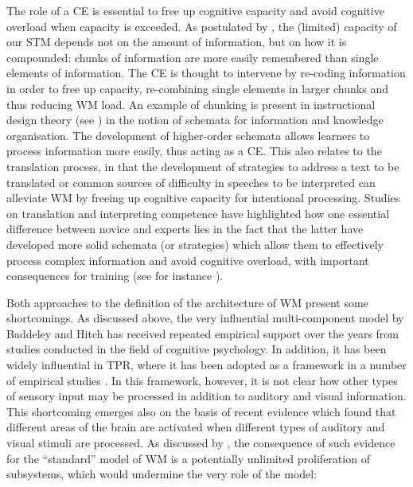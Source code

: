 The role of a CE is essential to free up cognitive capacity and avoid cognitive overload when capacity is exceeded. As postulated by \citet{miller_magical_1956}, the (limited) capacity of our STM depends not on the amount of information, but on how it is compounded: chunks of information are more easily remembered than single elements of information. The CE is thought to intervene by re-coding information in order to free up capacity, re-combining single elements in larger chunks and thus reducing WM load. An example of chunking is present in instructional design theory (see \citealt{van_merrienboer_cognitive_2005}) in the notion of schemata for information and knowledge organisation. The development of higher-order schemata allows learners to process information more easily, thus acting as a CE. This also relates to the translation process, in that the development of strategies to address a text to be translated or common sources of difficulty in speeches to be interpreted can alleviate WM by freeing up cognitive capacity for intentional processing. Studies on translation and interpreting competence have highlighted how one essential difference between novice and experts lies in the fact that the latter have developed more solid schemata (or strategies) which allow them to effectively process complex information and avoid cognitive overload, with important consequences for training (see for instance \citealt{riccardi_evolution_2005}).

Both approaches to the definition of the architecture of WM present some shortcomings. As discussed above, the very influential multi-component model by Baddeley and Hitch has received repeated empirical support over the years from studies conducted in the field of cognitive psychology. In addition, it has been widely influential in TPR, where it has been adopted as a framework in a number of empirical studies \citep{daro_verbal_1994,dragsted_segmentation_2004,mizuno_process_2005,padilla_articulatory_2005,kosma_fonctionnement_2007,hvelplund_allocation_2011,kopke_methodological_2012,ferreira_simultaneous_2015}.
In this framework, however, it is not clear how other types of sensory input may be processed in addition to auditory and visual information. This shortcoming emerges also on the basis of recent evidence which found that different areas of the brain are activated when different types of auditory and visual stimuli are processed. As discussed by \citet{postle_working_2006}, the consequence of such evidence for the ``standard'' model of WM is a potentially unlimited proliferation of subsystems, which would undermine the very role of the model: 

